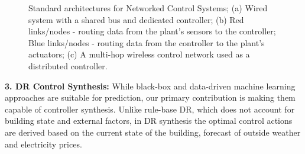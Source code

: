 \begin{figure}
	\begin{center}
	\end{center}	
\vspace{-10pt}
\label{fig:ncs_full}
\caption{Standard architectures for Networked Control Systems; (a) Wired system with a shared bus and dedicated controller; (b) Red links/nodes - routing data from the plant's sensors to the controller; Blue links/nodes - routing data from the controller to the plant's actuators; (c) A multi-hop wireless control network used as a distributed controller.}
\end{figure}
\textbf{3. DR Control Synthesis:}  While black-box and data-driven machine learning approaches are suitable for prediction, our primary contribution is making them capable of controller synthesis. 
Unlike rule-base DR, which does not account for building state and external factors, in DR synthesis the optimal control actions are derived based on the current state of the building, forecast of outside weather and electricity prices.
